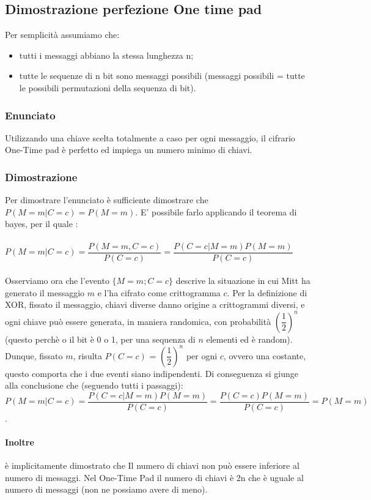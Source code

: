 \subsection{Dimostrazione perfezione One time pad}
Per semplicità assumiamo che:
\begin{itemize}
	\item tutti i messaggi abbiano la stessa lunghezza n;
	\item tutte le sequenze di n bit sono messaggi possibili (messaggi possibili = tutte le possibili permutazioni della sequenza di bit).
\end{itemize}
\subsubsection{Enunciato}
Utilizzando una chiave scelta totalmente a caso per ogni messaggio, il cifrario One-Time pad è perfetto ed impiega un numero minimo di chiavi.
\subsubsection{Dimostrazione}
Per dimostrare l'enunciato è sufficiente dimostrare che $P(M = m | C = c) = P(M = m)$. E' possibile farlo applicando il teorema di bayes, per il quale :\\\\
$P(M = m | C = c) = \dfrac{P(M = m, C = c)}{P(C = c)} = \dfrac{P(C=c | M = m) P(M = m)}{P(C = c)}$\\\\
Osserviamo ora che l’evento $\{M = m; C = c\}$ descrive la situazione in cui Mitt ha generato il messaggio $m$ e l’ha cifrato come crittogramma $c$. Per la definizione di XOR, fissato il messaggio, chiavi diverse danno origine a crittogrammi diversi, e ogni chiave può essere generata, in maniera randomica, con probabilità $(\dfrac{1}{2})^n$ (questo perchè o il bit è 0 o 1, per una sequenza di $n$ elementi ed è random). Dunque, fissato $m$, risulta $P(C = c)$ = $(\dfrac{1}{2})^n$ per ogni $c$, ovvero una costante, questo comporta che i due eventi siano indipendenti. Di conseguenza si giunge alla conclusione che (seguendo tutti i passaggi):\\

$P(M = m | C = c) = \dfrac{P(C=c | M = m) P(M = m)}{P(C = c)} = \dfrac{P(C = c) P(M = m)}{P(C = c)} = P(M = m)$.

\paragraph{Inoltre} è implicitamente dimostrato che Il numero di chiavi non può essere inferiore al numero di messaggi. Nel One-Time Pad il numero di chiavi è 2n
che è uguale al numero di messaggi (non ne possiamo avere di meno).
